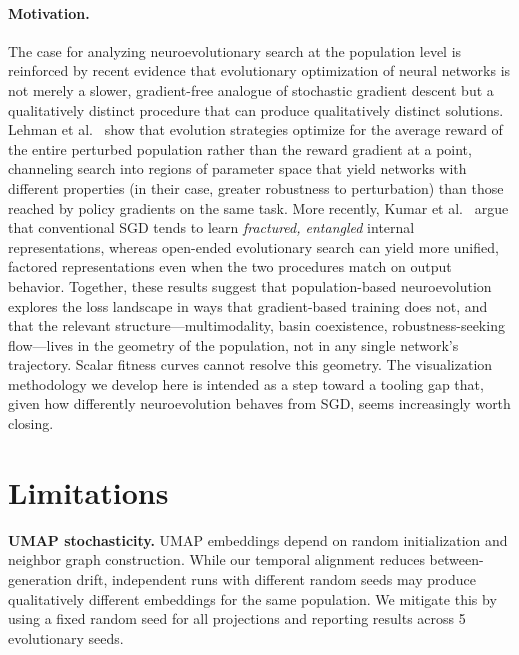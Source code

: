 \documentclass{article}
\begin{document}
\paragraph{Motivation.}
The case for analyzing neuroevolutionary search at the population
level is reinforced by recent evidence that evolutionary optimization
of neural networks is not merely a slower, gradient-free analogue of
stochastic gradient descent but a qualitatively distinct procedure
that can produce qualitatively distinct solutions. Lehman et al.\
\cite{lehman2018es} show that evolution strategies optimize for the
average reward of the entire perturbed population rather than the
reward gradient at a point, channeling search into regions of
parameter space that yield networks with different properties (in
their case, greater robustness to perturbation) than those reached by
policy gradients on the same task. More recently, Kumar et al.\
\cite{kumar2025fractured} argue that conventional SGD tends to learn
\emph{fractured, entangled} internal representations, whereas
open-ended evolutionary search can yield more unified, factored
representations even when the two procedures match on output
behavior. Together, these results suggest that population-based
neuroevolution explores the loss landscape in ways that gradient-based
training does not, and that the relevant structure---multimodality,
basin coexistence, robustness-seeking flow---lives in the geometry of
the population, not in any single network's trajectory. Scalar
fitness curves cannot resolve this geometry. The visualization
methodology we develop here is intended as a step toward a tooling
gap that, given how differently neuroevolution behaves from SGD,
seems increasingly worth closing.


\section{Limitations}
\label{sec:limitations}

\textbf{UMAP stochasticity.} UMAP embeddings depend on random
initialization and neighbor graph construction. While our temporal
alignment reduces between-generation drift, independent runs with
different random seeds may produce qualitatively different embeddings
for the same population. We mitigate this by using a fixed random seed
for all projections and reporting results across 5 evolutionary seeds.
\end{document}
